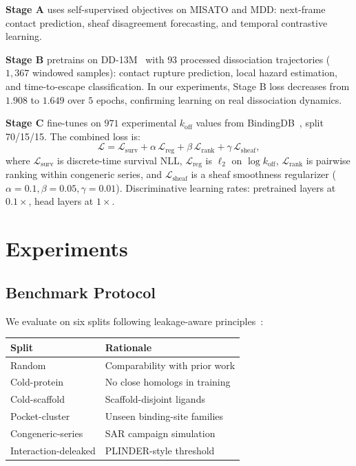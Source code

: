 \documentclass{article}
\begin{document}
\textbf{Stage A} uses self-supervised objectives on MISATO and MDD:
next-frame contact prediction, sheaf disagreement forecasting, and
temporal contrastive learning.

\textbf{Stage B} pretrains on DD-13M~\citep{wang2025dd13m} with
$93$ processed dissociation trajectories ($1{,}367$ windowed samples):
contact rupture prediction, local hazard estimation, and time-to-escape
classification.  In our experiments, Stage B loss decreases from
$1.908$ to $1.649$ over $5$ epochs, confirming learning on real
dissociation dynamics.

\textbf{Stage C} fine-tunes on $971$ experimental $k_\text{off}$ values
from BindingDB~\citep{gilson2016bindingdb}, split 70/15/15.
The combined loss is:
\begin{equation}
  \mathcal{L}
  = \mathcal{L}_\text{surv}
  + \alpha\,\mathcal{L}_\text{reg}
  + \beta\,\mathcal{L}_\text{rank}
  + \gamma\,\mathcal{L}_\text{sheaf},
  \label{eq:loss}
\end{equation}
where $\mathcal{L}_\text{surv}$ is discrete-time survival NLL,
$\mathcal{L}_\text{reg}$ is $\ell_2$ on $\log k_\text{off}$,
$\mathcal{L}_\text{rank}$ is pairwise ranking within congeneric
series, and $\mathcal{L}_\text{sheaf}$ is a sheaf smoothness
regularizer ($\alpha{=}0.1, \beta{=}0.05, \gamma{=}0.01$).
Discriminative learning rates: pretrained layers at $0.1\times$,
head layers at $1\times$.

\section{Experiments}
\label{sec:experiments}

\subsection{Benchmark Protocol}
\label{sec:benchmark}

We evaluate on six splits following leakage-aware
principles~\citep{durairaj2024plinder,li2025cleansplit}:

\begin{center}
\footnotesize
\begin{tabular}{@{}ll@{}}
\toprule
\textbf{Split} & \textbf{Rationale} \\
\midrule
Random & Comparability with prior work \\
Cold-protein & No close homologs in training \\
Cold-scaffold & Scaffold-disjoint ligands \\
Pocket-cluster & Unseen binding-site families \\
Congeneric-series & SAR campaign simulation \\
Interaction-deleaked & PLINDER-style threshold \\
\bottomrule
\end{tabular}
\end{center}
\end{document}

